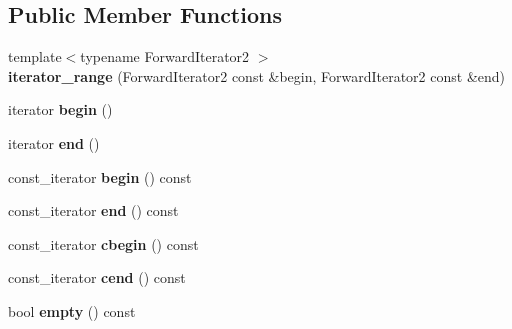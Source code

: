 \subsection*{Public Member Functions}
\begin{DoxyCompactItemize}
\item 
{\footnotesize template$<$typename Forward\+Iterator2 $>$ }\\{\bfseries iterator\+\_\+range} (Forward\+Iterator2 const \&begin, Forward\+Iterator2 const \&end)\hypertarget{classv8_1_1base_1_1iterator__range_ae6fbc9cf619214ff02a7ee3615d5cdec}{}\label{classv8_1_1base_1_1iterator__range_ae6fbc9cf619214ff02a7ee3615d5cdec}

\item 
iterator {\bfseries begin} ()\hypertarget{classv8_1_1base_1_1iterator__range_a02f806b0035404d5b93bcb9e8332a45e}{}\label{classv8_1_1base_1_1iterator__range_a02f806b0035404d5b93bcb9e8332a45e}

\item 
iterator {\bfseries end} ()\hypertarget{classv8_1_1base_1_1iterator__range_a60af7d9ea3bd27d3051ba92215a75e1b}{}\label{classv8_1_1base_1_1iterator__range_a60af7d9ea3bd27d3051ba92215a75e1b}

\item 
const\+\_\+iterator {\bfseries begin} () const \hypertarget{classv8_1_1base_1_1iterator__range_ad64339a7392bd53796e0212496071e86}{}\label{classv8_1_1base_1_1iterator__range_ad64339a7392bd53796e0212496071e86}

\item 
const\+\_\+iterator {\bfseries end} () const \hypertarget{classv8_1_1base_1_1iterator__range_aecc7c62efe0500b5fbfcf7261faa0a41}{}\label{classv8_1_1base_1_1iterator__range_aecc7c62efe0500b5fbfcf7261faa0a41}

\item 
const\+\_\+iterator {\bfseries cbegin} () const \hypertarget{classv8_1_1base_1_1iterator__range_a3b617586e5c9bb27ef66eb8d3ec233b7}{}\label{classv8_1_1base_1_1iterator__range_a3b617586e5c9bb27ef66eb8d3ec233b7}

\item 
const\+\_\+iterator {\bfseries cend} () const \hypertarget{classv8_1_1base_1_1iterator__range_a2eb47f70fc5dae3ff294977a11faff7d}{}\label{classv8_1_1base_1_1iterator__range_a2eb47f70fc5dae3ff294977a11faff7d}

\item 
bool {\bfseries empty} () const \hypertarget{classv8_1_1base_1_1iterator__range_a5907eaa21bbdda9fef41ed4850f038c1}{}\label{classv8_1_1base_1_1iterator__range_a5907eaa21bbdda9fef41ed4850f038c1}


\end{DoxyCompactItemize}
